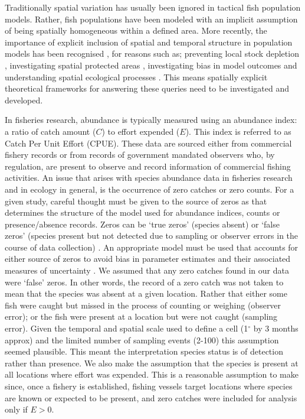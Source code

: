 \documentclass[review]{elsarticle}
\begin{document}
	Traditionally spatial variation has usually been ignored in tactical fish population models. Rather, fish populations have been modeled with an implicit assumption of being spatially homogeneous within a defined area. More recently, the importance of explicit inclusion of spatial and temporal structure in population models has been recognised \citep{cope2011}, for reasons such as; preventing local stock depletion \citep{ying2011}, investigating spatial protected areas \citep{botsford2009}, investigating bias in model outcomes \citep{su2012} and understanding spatial ecological processes \citep{chandler2014}. This means spatially explicit theoretical frameworks for answering these queries need to be investigated and developed.  
	
In fisheries research, abundance is typically measured using an abundance index: a ratio of catch amount ($C$) to effort expended ($E$). This index is referred to as Catch Per Unit Effort (CPUE). These data are sourced either from commercial fishery records or from records of government mandated observers who, by regulation, are present to observe and record information of commercial fishing activities.  An issue that arises with species abundance data in fisheries research and in ecology in general, is the occurrence of zero catches or zero counts. For a given study, careful thought must be given to the source of zeros as that determines the structure of the model used for abundance indices, counts or presence/absence records.  Zeros can be `true zeros' (species absent) or `false zeros' (species present but not detected due to sampling or observer errors in the course of data collection) \citep{martin2005}. An appropriate model must be used that accounts for either source of zeros to avoid bias in parameter estimates and their associated measures of uncertainty \citep{lambert1992, mackenzie2002}. We assumed that any zero catches found in our data were `false' zeros.  In other words, the record of a zero catch was not taken to mean that the species was absent at a given location.  Rather that either some fish were caught but missed in the process of counting or weighing (observer error); or the fish were present at a location but were not caught (sampling error). Given the temporal and spatial scale used to define a cell (1$^\circ$ by 3 months approx) and the limited number of sampling events (2-100) this assumption seemed plausible. This meant the interpretation species status is of detection rather than presence. 
 We also make the assumption that the species is present at all locations where effort was expended.  This is a reasonable assumption to make since, once a fishery is established, fishing vessels target locations where species are known or expected to be present, and zero catches were included for analysis only if $E>0$.   
	
\end{document}
